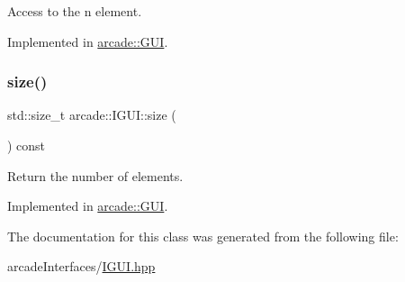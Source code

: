 Access to the n element. 



Implemented in \hyperlink{classarcade_1_1_g_u_i_ab94910ea11fc43430227bfc716fd8c80}{arcade\+::\+G\+UI}.

\mbox{\label{classarcade_1_1_i_g_u_i_a5e9b36772c4affcc58243880e6d51d62}} 
\subsubsection{\texorpdfstring{size()}{size()}}
{\footnotesize\ttfamily std\+::size\+\_\+t arcade\+::\+I\+G\+U\+I\+::size (\begin{DoxyParamCaption}{ }\end{DoxyParamCaption}) const\hspace{0.3cm}{\ttfamily [pure virtual]}}



Return the number of elements. 



Implemented in \hyperlink{classarcade_1_1_g_u_i_aa38b306ad674a221e0815cb600409598}{arcade\+::\+G\+UI}.



The documentation for this class was generated from the following file\+:\begin{DoxyCompactItemize}
\item 
arcade\+Interfaces/\hyperlink{_i_g_u_i_8hpp}{I\+G\+U\+I.\+hpp}\end{DoxyCompactItemize}
